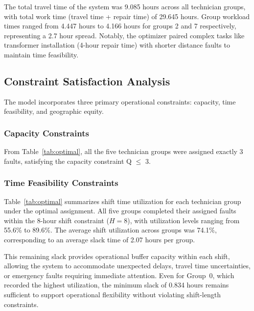 \documentclass[11pt]{article}
\begin{document}
The total travel time of the system was 9.085 hours across all technician groups, with total work time (travel time + repair time) of 29.645 hours. Group workload times ranged from 4.447 hours to 4.166 hours for groups 2 and 7 respectively, representing a 2.7 hour spread. Notably, the optimizer paired complex tasks like transformer installation (4-hour repair time) with shorter distance faults to maintain time feasibility.

\subsection*{Constraint Satisfaction Analysis}

The model incorporates three primary operational constraints: capacity, time feasibility, and geographic equity. 

\subsubsection*{Capacity Constraints}

From  Table~\ref{tab:optimal}, all the five technician groups were assigned exactly 3 faults, satisfying the capacity constraint Q $\le$ 3.


\subsubsection*{Time Feasibility Constraints}

Table~\ref{tab:optimal} summarizes shift time utilization for each technician group under the optimal assignment. All five groups completed their assigned faults within the 8-hour shift constraint ($H = 8$), with utilization levels ranging from 55.6\% to 89.6\%. The average shift utilization across groups was 74.1\%, corresponding to an average slack time of 2.07 hours per group.

This remaining slack provides operational buffer capacity within each shift, allowing the system to accommodate unexpected delays, travel time uncertainties, or emergency faults requiring immediate attention. Even for Group~0, which recorded the highest utilization, the minimum slack of 0.834 hours remains sufficient to support operational flexibility without violating shift-length constraints.
\end{document}
